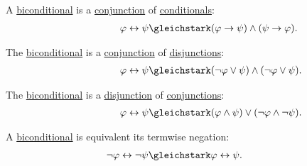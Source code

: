 \begin{proposition}
\begin{thmenum}
     A \hyperref[def:propositional_language/connectives/biconditional]{biconditional} is a \hyperref[def:propositional_language/connectives/conjunction]{conjunction} of \hyperref[def:propositional_language/connectives]{conditionals}:
    \begin{equation}\label{eq:thm:boolean_equivalences/biconditional_via_conditionals}
      \begin{split}
        \mathllap{\varphi \leftrightarrow \psi} &\gleichstark \mathrlap{(\varphi \rightarrow \psi) \wedge (\psi \rightarrow \varphi).}
      \end{split}
    \end{equation}

     The \hyperref[def:propositional_language/connectives/biconditional]{biconditional} is a \hyperref[def:propositional_language/connectives/disjunction]{conjunction} of \hyperref[def:propositional_language/connectives/conjunction]{disjunctions}:
    \begin{equation}\label{eq:thm:boolean_equivalences/biconditional_as_conjunction}
      \begin{split}
        \mathllap{\varphi \leftrightarrow \psi} &\gleichstark \mathrlap{(\neg \varphi \vee \psi) \wedge (\neg \varphi \vee \psi).}
      \end{split}
    \end{equation}

     The \hyperref[def:propositional_language/connectives/biconditional]{biconditional} is a \hyperref[def:propositional_language/connectives/disjunction]{disjunction} of \hyperref[def:propositional_language/connectives/conjunction]{conjunctions}:
    \begin{equation}\label{eq:thm:boolean_equivalences/biconditional_as_disjunction}
      \begin{split}
        \mathllap{\varphi \leftrightarrow \psi} &\gleichstark \mathrlap{(\varphi \wedge \psi) \vee (\neg \varphi \wedge \neg \psi).}
      \end{split}
    \end{equation}

     A \hyperref[def:propositional_language/connectives/biconditional]{biconditional} is equivalent its termwise negation:
    \begin{equation}\label{eq:thm:boolean_equivalences/biconditional_member_negation}
      \begin{split}
        \mathllap{\neg \varphi \leftrightarrow \neg \psi} &\gleichstark \mathrlap{\varphi \leftrightarrow \psi.}
      \end{split}
    \end{equation}


\end{thmenum}
\end{proposition}
